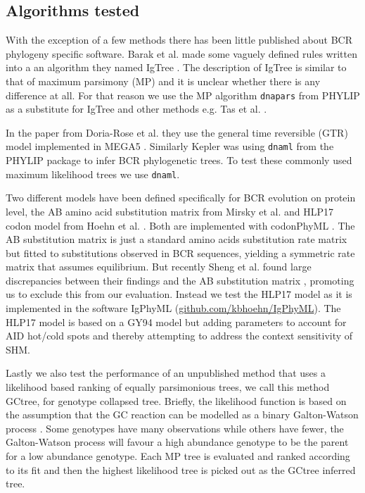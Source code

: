 \subsection{Algorithms tested}
With the exception of a few methods there has been little published about BCR phylogeny specific software.
Barak et al. made some vaguely defined rules written into a an algorithm they named IgTree \cite{Barak2008-fw}.
The description of IgTree is similar to that of maximum parsimony (MP) and it is unclear whether there is any difference at all.
For that reason we use the MP algorithm \texttt{dnapars} from PHYLIP \cite{plotree1989phylip} as a substitute for IgTree and other methods e.g. Tas et al. \cite{tas2016visualizing}.

In the paper from Doria-Rose et al. \cite{Doria-Rose2014-vi} they use the general time reversible (GTR) model implemented in MEGA5 \cite{tamura2011mega5}.
Similarly Kepler \cite{Kepler2013-sy} was using \texttt{dnaml} from the PHYLIP package to infer BCR phylogenetic trees.
To test these commonly used maximum likelihood trees we use \texttt{dnaml}.

Two different models have been defined specifically for BCR evolution on protein level, the AB amino acid substitution matrix from Mirsky et al. \cite{mirsky2014antibody} and HLP17 codon model from Hoehn et al. \cite{Hoehn2016-wg}.
Both are implemented with codonPhyML \cite{gil2013codonphyml}.
The AB substitution matrix is just a standard amino acids substitution rate matrix but fitted to substitutions observed in BCR sequences, yielding a symmetric rate matrix that assumes equilibrium.
But recently Sheng et al. found large discrepancies between their findings and the AB substitution matrix \cite{sheng2017gene}, promoting us to exclude this from our evaluation.
Instead we test the HLP17 model as it is implemented in the software IgPhyML (\url{github.com/kbhoehn/IgPhyML}).
The HLP17 model is based on a GY94 model \cite{goldman1994codon} but adding parameters to account for AID hot/cold spots and thereby attempting to address the context sensitivity of SHM.

Lastly we also test the performance of an unpublished method that uses a likelihood based ranking of equally parsimonious trees, we call this method GCtree, for genotype collapsed tree.
Briefly, the likelihood function is based on the assumption that the GC reaction can be modelled as a binary Galton-Watson process \cite{harris2002theory}.
Some genotypes have many observations while others have fewer, the Galton-Watson process will favour a high abundance genotype to be the parent for a low abundance genotype.
Each MP tree is evaluated and ranked according to its fit and then the highest likelihood tree is picked out as the GCtree inferred tree.



